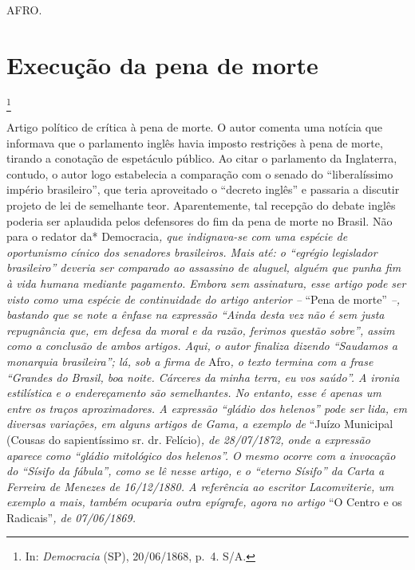 AFRO.

\chapter{Execução da pena de morte}\footnote{In: \emph{Democracia} (SP),
  20/06/1868, p.~4. S/A.}

\begin{didascalia}
Artigo político de crítica à pena de morte. O autor comenta uma notícia
que informava que o parlamento inglês havia imposto restrições à pena de
morte, tirando a conotação de espetáculo público. Ao citar o parlamento
da Inglaterra, contudo, o autor logo estabelecia a comparação com o
senado do ``liberalíssimo império brasileiro'', que teria aproveitado o
``decreto inglês'' e passaria a discutir projeto de lei de semelhante
teor. Aparentemente, tal recepção do debate inglês poderia ser aplaudida
pelos defensores do fim da pena de morte no Brasil. Não para o redator
da* Democracia\emph{, que indignava-se com uma espécie de oportunismo
cínico dos senadores brasileiros. Mais até: o ``egrégio legislador
brasileiro'' deveria ser comparado ao assassino de aluguel, alguém que
punha fim à vida humana mediante pagamento. Embora sem assinatura, esse
artigo pode ser visto como uma espécie de continuidade do artigo
anterior --} ``Pena de morte'' \emph{--, bastando que se note a ênfase na
expressão ``Ainda desta vez não é sem justa repugnância que, em defesa da
moral e da razão, ferimos questão sobre'', assim como a conclusão de
ambos artigos. Aqui, o autor finaliza dizendo ``Saudamos a monarquia
brasileira''; lá, sob a firma de} Afro\emph{, o texto termina com a frase
``Grandes do Brasil, boa noite. Cárceres da minha terra, eu vos saúdo''. A
ironia estilística e o endereçamento são semelhantes. No entanto, esse é
apenas um entre os traços aproximadores. A expressão ``gládio dos
helenos'' pode ser lida, em diversas variações, em alguns artigos de
Gama, a exemplo de} ``Juízo Municipal (Cousas do sapientíssimo sr. dr.
Felício)\emph{, de 28/07/1872, onde a expressão aparece como ``gládio
mitológico dos helenos''. O mesmo ocorre com a invocação do ``Sísifo da
fábula'', como se lê nesse artigo, e o ``eterno Sísifo'' da Carta a
Ferreira de Menezes de 16/12/1880. A referência ao escritor
Lacomviterie, um exemplo a mais, também ocuparia outra epígrafe, agora
no artigo} ``O Centro e os Radicais''\emph{, de 07/06/1869.}
\end{didascalia}

\asterisc{}

